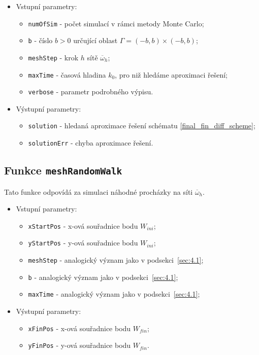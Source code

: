 \documentclass[11pt,american,czech]{article}
\newcommand*\midpoint[1]{\overline{#1}}
\begin{document}
\begin{itemize}
	\item Vstupní parametry:
		\begin{itemize}
			\item \texttt{numOfSim} - počet simulací v rámci metody Monte Carlo;
			\item \texttt{b} - číslo $b>0$ určující oblast $\Gamma=(-b,b)\times(-b,b)$;
			\item \texttt{meshStep} - krok $h$ sítě $\midpoint{\omega}_{h}$;
			\item \texttt{maxTime} - časová hladina $k_{0}$, pro niž hledáme aproximaci řešení;
			\item \texttt{verbose} - parametr podrobného výpisu.
		\end{itemize}
	\item Výstupní parametry:
		\begin{itemize}
			\item \texttt{solution} - hledaná aproximace řešení schématu \eqref{final_fin_diff_scheme};
			\item \texttt{solutionErr} - chyba aproximace řešení.
		\end{itemize}
\end{itemize}

\subsection{Funkce \texttt{meshRandomWalk}}\label{sec:4.2}

Tato funkce odpovídá za simulaci náhodné procházky na síti $\midpoint{\omega}_{h}$.

\begin{itemize}
	\item Vstupní parametry:
	\begin{itemize}
			\item \texttt{xStartPos} - x-ová souřadnice bodu $W_{ini}$;
			\item \texttt{yStartPos} - y-ová souřadnice bodu $W_{ini}$;
			\item \texttt{meshStep} - analogický význam jako v podsekci~\ref{sec:4.1};
			\item \texttt{b} - analogický význam jako v podsekci~\ref{sec:4.1};
			\item \texttt{maxTime} - analogický význam jako v podsekci~\ref{sec:4.1};
	\end{itemize}
	\item Výstupní parametry:
	\begin{itemize}
			\item \texttt{xFinPos} - x-ová souřadnice bodu $W_{fin}$;
			\item \texttt{yFinPos} - y-ová souřadnice bodu $W_{fin}$.
	\end{itemize}
\end{itemize}
\end{document}

